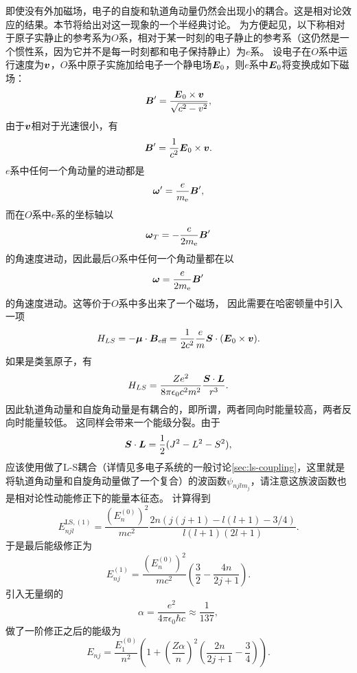 即使没有外加磁场，电子的自旋和轨道角动量仍然会出现小的耦合。这是相对论效应的结果。本节将给出对这一现象的一个半经典讨论。
为方便起见，以下称相对于原子实静止的参考系为$O$系，相对于某一时刻的电子静止的参考系（这仍然是一个惯性系，因为它并不是每一时刻都和电子保持静止）为$e$系。
设电子在$O$系中运行速度为$\vb*{v}$，$O$系中原子实施加给电子一个静电场$\vb*{E}_0$，则$e$系中$\vb*{E}_0$将变换成如下磁场：
\[
    \vb*{B}' = \frac{\vb*{E}_0 \times \vb*{v}}{\sqrt{c^2 - v^2}},
\]
由于$\vb*{v}$相对于光速很小，有
\begin{equation}
    \vb*{B}' = \frac{1}{c^2} \vb*{E}_0 \times \vb*{v}.
\end{equation}
$e$系中任何一个角动量的进动都是%
\[
    \vb*{\omega}' = \frac{e}{m_\text{e}} \vb*{B}',
\]
而在$O$系中$e$系的坐标轴以
\[
    \vb*{\omega}_T = - \frac{e}{2 m_\text{e}} \vb*{B}'
\]
的角速度进动，因此最后$O$系中任何一个角动量都在以
\begin{equation}
    \vb*{\omega} = \frac{e}{2 m_\text{e}} \vb*{B}'
\end{equation}
的角速度进动。这等价于$O$系中多出来了一个磁场，%
因此需要在哈密顿量中引入一项
\begin{equation}
    {H}_{LS} = - \vb*{\mu} \cdot \vb*{B}_\text{eff} = \frac{1}{2c^2} \frac{e}{m} \vb*{S} \cdot (\vb*{E}_0 \times \vb*{v}).
\end{equation}
如果是类氢原子，有
\begin{equation}
    {H}_{LS} = \frac{Ze^2}{8 \pi \epsilon_0 c^2 m^2} \frac{\vb*{S} \cdot \vb*{L}}{r^3}.
    \label{eq:spin-ortibal-coupling}
\end{equation}
因此轨道角动量和自旋角动量是有耦合的，即所谓，两者同向时能量较高，两者反向时能量较低。
这同样会带来一个能级分裂。由于
\[
    \vb*{S} \cdot \vb*{L} = \frac{1}{2} (J^2 - L^2 - S^2),
\]
应该使用做了L-S耦合（详情见多电子系统的一般讨论\autoref{sec:ls-coupling}，这里就是将轨道角动量和自旋角动量做了一个复合）的波函数$\psi_{njl m_j}$，请注意这族波函数也是相对论性动能修正下的能量本征态。
计算得到
\begin{equation}
    E^{\text{LS}, (1)}_{njl} = \frac{(E^{(0)}_n)^2}{mc^2} \frac{2n (j(j+1) - l(l+1) - 3/4)}{l(l+1)(2l+1)}.
\end{equation}
于是最后能级修正为
\begin{equation}
    E^{(1)}_{nj} = \frac{(E^{(0)}_n)^2}{mc^2} \left( \frac{3}{2} - \frac{4 n}{2 j + 1} \right).
\end{equation}
引入无量纲的
\begin{equation}
    \alpha = \frac{e^2}{4\pi \epsilon_0 \hbar c} \approx \frac{1}{137},
\end{equation}
做了一阶修正之后的能级为
\begin{equation}
    E_{n j} = \frac{E_1^{(0)}}{n^2} \left( 1 + \left( \frac{Z \alpha}{n} \right)^2 \left(  \frac{2 n}{2 j + 1} - \frac{3}{4} \right) \right).
\end{equation}

